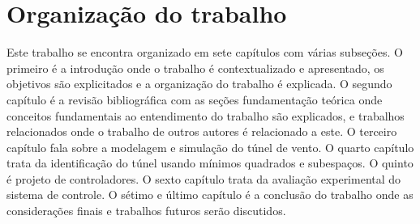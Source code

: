 \section{Organização do trabalho}
Este trabalho se encontra organizado em sete capítulos com várias subseções. O primeiro é a introdução onde o trabalho é contextualizado e apresentado, os objetivos são explicitados e a organização do trabalho é explicada. O segundo capítulo é a revisão bibliográfica com as seções fundamentação teórica onde conceitos fundamentais ao entendimento do trabalho são explicados, e trabalhos relacionados onde o trabalho de outros autores é relacionado a este. O terceiro capítulo fala sobre a modelagem e simulação do túnel de vento. O quarto capítulo trata da identificação do túnel usando mínimos quadrados e subespaços. O quinto é projeto de controladores. O sexto capítulo trata da avaliação experimental do sistema de controle. O sétimo e último capítulo é a conclusão do trabalho onde as considerações finais e trabalhos futuros serão discutidos.


